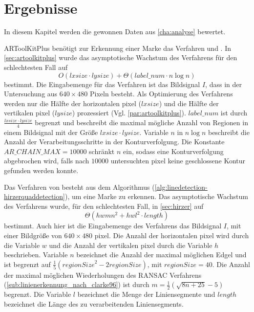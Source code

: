 \chapter{Ergebnisse} %
\label{cha:ergebnisse}
\begin{comment}
	Ergebnisse: Die gewonnen Daten aus Kap. Analyse bewerten.
\end{comment}

In diesem Kapitel werden die gewonnen Daten aus \autoref{cha:analyse} bewertet.

ARToolKitPlus benötigt zur Erkennung einer Marke das Verfahren  und
 . In \autoref{sec:artoolkitplus} wurde das asymptotische Wachstum des Verfahrens für den
 schlechtesten Fall auf
\begin{equation*}
O(\mathit{lxsize}\cdot\mathit{lysize})  + \Theta(\mathit{label\_num}\cdot n \log n)
\end{equation*}
bestimmt. Die Eingabemenge für das Verfahren ist das Bildsignal $I$, dass in der Untersuchung aus $640 \times 480$
 Pixeln besteht. Als Optimierung des Verfahrens werden nur die Hälfte der horizontalen \gls{pixel} ($\mathit{lxsize}$)
 und die Hälfte der vertikalen \gls{pixel} ($\mathit{lysize}$) prozessiert (Vgl. \autoref{par:artoolkitplus}).
 $\mathit{label\_num}$ ist durch $\tfrac{\mathit{lxsize}\cdot\mathit{lysize}}{4}$ begrenzt und beschreibt die maximal
 mögliche Anzahl von Regionen in einem Bildsignal mit der Größe $\mathit{lxsize}\cdot\mathit{lysize}$. Variable $n$ in
 $n \log n$ beschreibt die Anzahl der Verarbeitungsschritte in der Konturverfolgung. Die Konstante
 $\mathit{AR\_CHAIN\_MAX} = 10000$ schränkt $n$ ein, sodass eine Konturverfolgung abgebrochen wird, falls nach $10000$
 untersuchten \gls{pixel} keine geschlossene Kontur gefunden werden konnte.

Das Verfahren von \citeauthor{hirzer08} besteht aus dem Algorithmus 
 (\autoref{alg:linedetection-hirzerquaddetection}), um eine Marke zu erkennen. Das asymptotische Wachstum des
 Verfahrens wurde, für den schlechtesten Fall, in \autoref{sec:hirzer} auf
\begin{equation*}
\Theta(hwmn^2+hwl^2\cdot\mathit{length})
\end{equation*}
bestimmt. Auch hier ist die Eingabemenge des Verfahrens das Bildsignal $I$, mit einer Bildgröße von $640 \times 480$
 \gls{pixel}. Die Anzahl der horizontalen \gls{pixel} wird durch die Variable $w$ und die Anzahl der vertikalen
 \gls{pixel} durch die Variable $h$ beschrieben. Variable $n$ bezeichnet die Anzahl der maximal möglichen Edgel und ist
 begrenzt auf $\tfrac{1}{5}(\mathit{regionSize}^2 - 2\mathit{regionSize})$, mit $\mathit{regionSize} = 40$. Die Anzahl
 der maximal möglichen Wiederholungen des RANSAC Verfahrens (\autoref{sub:linienerkennung_nach_clarke96}) ist durch
 $m = \tfrac{1}{2}(\sqrt{8n + 25} - 5)$ begrenzt. Die Variable $l$ bezeichnet die Menge der Liniensegmente und
 $\mathit{length}$ bezeichnet die Länge des zu verarbeitenden Liniensegments.

